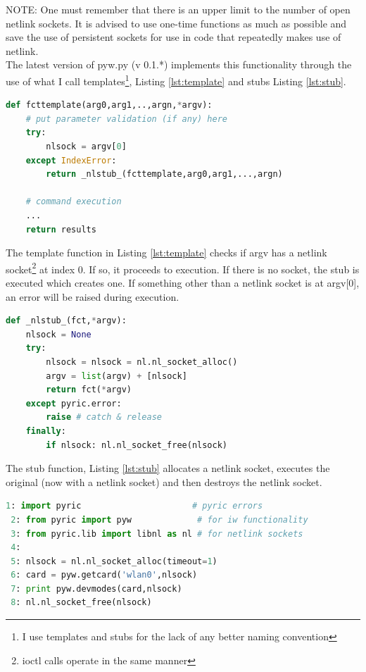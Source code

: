 \documentclass[11pt]{article}
\begin{document}
NOTE: One must remember that there is an upper limit to the number of open netlink
sockets. It is advised to use one-time functions as much as possible and save the
use of persistent sockets for use in code that repeatedly makes use of netlink. \\

The latest version of pyw.py (v 0.1.*) implements this functionality through the 
use of what I call templates\footnote{I use templates and stubs for the lack
of any better naming convention}, Listing \ref{lst:template} and stubs Listing 
\ref{lst:stub}.

\begin{lstlisting}[caption={A Basic Netlink Function Template},
                   label={lst:template},
                   language=Python]
def fcttemplate(arg0,arg1,..,argn,*argv):
    # put parameter validation (if any) here
    try:
        nlsock = argv[0]
    except IndexError:
        return _nlstub_(fcttemplate,arg0,arg1,...,argn)
        
    # command execution
    ...
    return results
\end{lstlisting}

The template function in Listing \ref{lst:template} checks if argv has a netlink
socket\footnote{ioctl calls operate in the same manner} at index 0. If so, it
proceeds to execution. If there is no socket, the stub is executed which creates 
one. If something other than a netlink socket is at argv[0], an error will be 
raised during execution. \\

\begin{lstlisting}[caption={Function \_nlstub\_},
                   label={lst:stub},
                   language=Python]
def _nlstub_(fct,*argv):
    nlsock = None
    try:
        nlsock = nlsock = nl.nl_socket_alloc()
        argv = list(argv) + [nlsock]
        return fct(*argv)
    except pyric.error: 
        raise # catch & release
    finally:
        if nlsock: nl.nl_socket_free(nlsock)
\end{lstlisting}

The stub function, Listing \ref{lst:stub} allocates a netlink socket, executes
the original (now with a netlink socket) and then destroys the netlink socket.\\

\begin{lstlisting}[caption={Using Persistent Sockets},
                   label={lst:persistent},
                   language=Python]
 1: import pyric                      # pyric errors
 2: from pyric import pyw             # for iw functionality
 3: from pyric.lib import libnl as nl # for netlink sockets
 4:
 5: nlsock = nl.nl_socket_alloc(timeout=1)
 6: card = pyw.getcard('wlan0',nlsock)
 7: print pyw.devmodes(card,nlsock)
 8: nl.nl_socket_free(nlsock)
\end{lstlisting}
\end{document}
